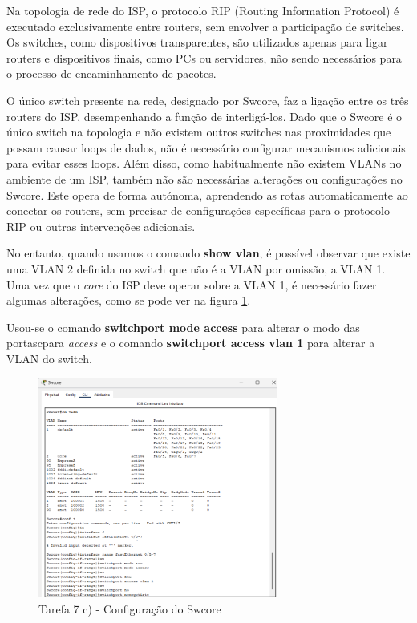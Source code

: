 \documentclass[11pt,english, openright, oneside]{book}
\begin{document}
Na topologia de rede do ISP, o protocolo RIP (Routing Information Protocol) é executado exclusivamente entre routers, sem envolver a participação de switches. Os switches, como dispositivos transparentes, são utilizados apenas para ligar routers e dispositivos finais, como PCs ou servidores, não sendo necessários para o processo de encaminhamento de pacotes.

\par O único switch presente na rede, designado por Swcore, faz a ligação entre os três routers do ISP, desempenhando a função de interligá-los. Dado que o Swcore é o único switch na topologia e não existem outros switches nas proximidades que possam causar loops de dados, não é necessário configurar mecanismos adicionais para evitar esses loops. Além disso, como habitualmente não existem VLANs no ambiente de um ISP, também não são necessárias alterações ou configurações no Swcore. Este opera de forma autónoma, aprendendo as rotas automaticamente ao conectar os routers, sem precisar de configurações específicas para o protocolo RIP ou outras intervenções adicionais.

\par No entanto, quando usamos o comando \textbf{show vlan}, é possível observar que existe uma VLAN 2 definida no switch que não é a VLAN por omissão, a VLAN 1. Uma vez que o \textit{core} do ISP deve operar sobre a VLAN 1, é necessário fazer algumas alterações, como se pode ver na figura \ref{fig:7.c}.
\par Usou-se o comando \textbf{switchport mode access} para alterar o modo das portascpara \textit{access} e o comando \textbf{switchport access vlan 1} para alterar a VLAN do switch.
\vspace{0.2cm}

\begin{figure}[H]
    \centering
    \includegraphics[width=0.7\textwidth]{imagens/Tarefa7/7.c.png}
    \caption{Tarefa 7 c) - Configuração do Swcore}
    \label{fig:7.c}
\end{figure}
\end{document}
